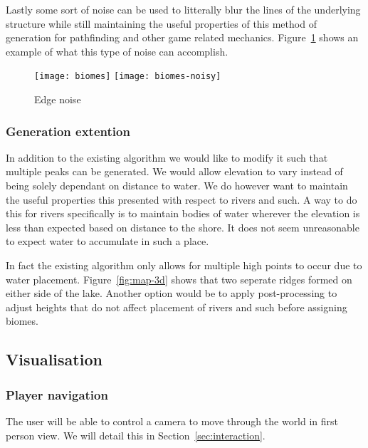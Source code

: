 Lastly some sort of noise can be used to litterally blur the lines of the underlying structure while still maintaining the useful properties of this method of generation for pathfinding and other game related mechanics. Figure~\ref{fig:biomes} shows an example of what this type of noise can accomplish.

\newlength{\imagewidth}

\begin{figure}[H]
	\centering
	\texttt{[image: biomes]}
	\texttt{[image: biomes-noisy]}
	\caption{Edge noise}
	\label{fig:biomes}
\end{figure}

\subsubsection{Generation extention}

In addition to the existing algorithm we would like to modify it such that multiple peaks can be generated. We would allow elevation to vary instead of being solely dependant on distance to water. We do however want to maintain the useful properties this presented with respect to rivers and such. A way to do this for rivers specifically is to maintain bodies of water wherever the elevation is less than expected based on distance to the shore. It does not seem unreasonable to expect water to accumulate in such a place. 

In fact the existing algorithm only allows for multiple high points to occur due to water placement. Figure~\ref{fig:map-3d} shows that two seperate ridges formed on either side of the lake. Another option would be to apply post-processing to adjust heights that do not affect placement of rivers and such before assigning biomes.

\subsection{Visualisation}

\subsubsection{Player navigation}

The user will be able to control a camera to move through the world in first person view.
We will detail this in Section~\ref{sec:interaction}.

